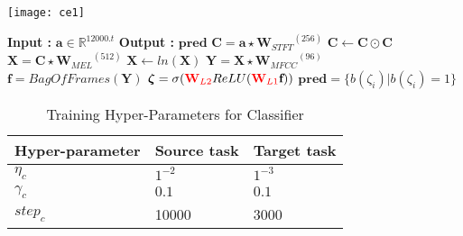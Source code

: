 \begin{algorithm}
\begin{minipage}{0.15\textwidth}
\texttt{[image: ce1]}
\end{minipage}
  \begin{minipage}{0.80\textwidth}
  \caption{$\textbf{pred}$ = $Model$($\textbf{a}$) }\label{exp:a2}
  \begin{algorithmic}[1]
    \Statex \textbf{Input :} $\textbf{a} \in \mathbb{R}^{12000.t}$
    \Statex \textbf{Output :} $\textbf{pred}$ 
    \State $\textbf{C} = \textbf{a} \star {\textbf{W}_{STFT}}^{(256)}$ 
    \State $\textbf{C} \leftarrow \textbf{C} \odot \textbf{C}$
    \State $\textbf{X} = \textbf{C} \star {\textbf{W}_{MEL}}^{(512)}$ 
    \State $\textbf{X} \leftarrow ln(\textbf{X})$
    \State $\textbf{Y} = \textbf{X} \star {\textbf{W}_{MFCC}}^{(96)}$ 
    \State $\textbf{f} = BagOfFrames(\textbf{Y})$ 
    \State $\bm{\zeta} = \sigma ({\color{red} \textbf{W}_{L2}} ReLU ({\color{red}\textbf{W}_{L1}}\textbf{f})) $ 
    \State $\textbf{pred} = \{ b(\zeta_{i}) | b(\zeta_{i}) = 1 \}$ 
  \end{algorithmic}
  \end{minipage}
\end{algorithm}
\FloatBarrier
\begin{table}[H]
\label{tab:a2}
\centering
\begin{tabular}{| p{} | p{} | p{} |}
\hline
\textbf{Hyper-parameter} & \textbf{Source task} & \textbf{Target task}\\
\hline
${\eta}_{c}$ & $1^{-2}$ & $1^{-3}$ \\ 
\hline
${\gamma}_{c}$ & $0.1$ & $ 0.1$\\
\hline
${step}_{c}$ & 10000 & 3000 \\
\hline
\end{tabular}
\caption{Training Hyper-Parameters for Classifier} 
\end{table}
